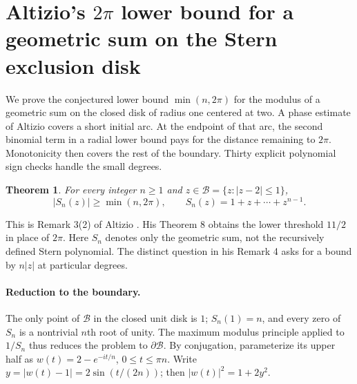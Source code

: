 \documentclass[11pt,a4paper]{article}
\numberwithin{equation}{section}
\newtheorem{theorem}{Theorem}[section]
\theoremstyle{definition}
\theoremstyle{remark}
\newenvironment{sectionabstract}{\par\smallskip\begingroup\small\noindent}{\par\endgroup\medskip}
\begin{document}
\par\endgroup

\begingroup
\newcommand{\B}{\mathcal B}
\section{\texorpdfstring{Altizio's \(2\pi\) lower bound for a geometric sum on the Stern exclusion disk}{Altizio's 2pi lower bound for a geometric sum on the Stern exclusion disk}}\label{section:r49reiwa}
\par\medskip


\begin{sectionabstract}
We prove the conjectured lower bound \(\min(n,2\pi)\) for the modulus of a geometric sum on the closed disk of radius one centered at two. A phase estimate of Altizio covers a short initial arc. At the endpoint of that arc, the second binomial term in a radial lower bound pays for the distance remaining to \(2\pi\). Monotonicity then covers the rest of the boundary. Thirty explicit polynomial sign checks handle the small degrees.
\end{sectionabstract}
\begin{theorem}\label{r49reiwa:T}
For every integer \(n\ge1\) and \(z\in\B=\{z:|z-2|\le1\}\),
\[
 |S_n(z)|\ge\min(n,2\pi),\qquad S_n(z)=1+z+\cdots+z^{n-1}.
\]
\end{theorem}
This is Remark 3(2) of Altizio \cite{r49reiwa:A}. His Theorem 8 obtains the lower threshold \(11/2\) in place of \(2\pi\). Here \(S_n\) denotes only the geometric sum, not the recursively defined Stern polynomial. The distinct question in his Remark 4 asks for a bound by \(n|z|\) at particular degrees.

\paragraph{Reduction to the boundary.} The only point of \(\B\) in the closed unit disk is \(1\); \(S_n(1)=n\), and every zero of \(S_n\) is a nontrivial \(n\)th root of unity. The maximum modulus principle applied to \(1/S_n\) thus reduces the problem to \(\partial\B\). By conjugation, parameterize its upper half as \(w(t)=2-e^{-it/n}\), \(0\le t\le\pi n\). Write \(y=|w(t)-1|=2\sin(t/(2n))\); then \(|w(t)|^2=1+2y^2\).
\end{document}

